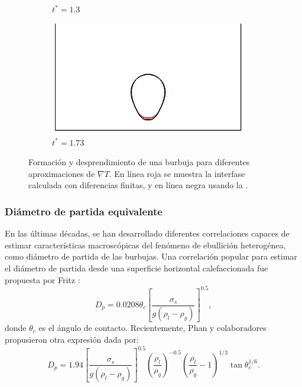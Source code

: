 \begin{figure}[htb]
\begin{subfigure}[t]{0.45\textwidth}
        \caption{$t^*=1.3$}
    \end{subfigure}    
    \begin{subfigure}[t]{0.45\textwidth}
        \centering
        \includegraphics[width=0.95\textwidth]{Imagenes/HetBoiling/gradT/60}
        \caption{$t^*=1.73$}
    \end{subfigure}        
    \caption{Formaci\'on y desprendimiento de una burbuja para diferentes aproximaciones de $\nabla T$. En l\'inea roja se muestra la interfase calculada con diferencias finitas, y en l\'inea negra usando la .}
    \label{fig:bubble2D_gradT}
\end{figure}



\subsubsection{Di\'ametro de partida equivalente}

En las \'ultimas d\'ecadas, se han desarrollado diferentes correlaciones capaces de estimar caracter\'isticas macrosc\'opicas del fen\'omeno de ebullici\'on heterog\'enea, como di\'ametro de partida de las burbujas. Una correlaci\'on popular para estimar el di\'ametro de partida desde una superficie horizontal calefaccionada fue propuesta por Fritz \cite{fritz_berechnung_1935}:
\begin{equation}
	D_p = 0.0208 \theta_c \left[ \dfrac{\sigma_s}{g(\rho_l-\rho_g)} \right]^{0.5},
	\label{eq:g_fritz}
\end{equation}
donde $\theta_c$ es el \'angulo de contacto. Recientemente, Phan y colaboradores propusieron otra expresi\'on dada por:
\begin{equation}
	D_p = 1.94 \left[ \dfrac{\sigma_s}{g(\rho_l-\rho_g)} \right]^{0.5} \left( \dfrac{\rho_l}{\rho_g} \right)^{-0.5} \left( \dfrac{\rho_l}{\rho_g} -1\right)^{1/3} \tan\theta_c^{1/6}.
	\label{eq:g_phan}
\end{equation}

